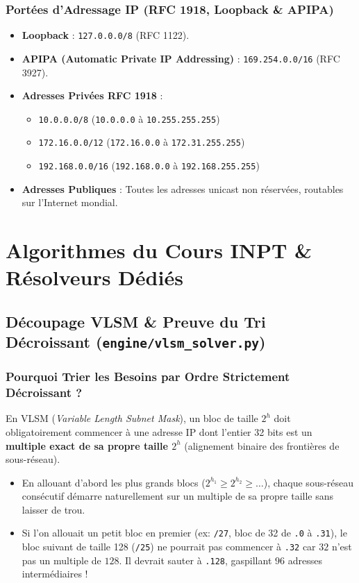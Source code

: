 \documentclass[11pt,a4paper]{report}
\begin{document}
\section{Port\'ees d'Adressage IP (RFC 1918, Loopback \& APIPA)}
\begin{itemize}
    \item \textbf{Loopback} : \texttt{127.0.0.0/8} (RFC 1122).
    \item \textbf{APIPA (Automatic Private IP Addressing)} : \texttt{169.254.0.0/16} (RFC 3927).
    \item \textbf{Adresses Priv\'ees RFC 1918} :
    \begin{itemize}
        \item \texttt{10.0.0.0/8} (\texttt{10.0.0.0} \`a \texttt{10.255.255.255})
        \item \texttt{172.16.0.0/12} (\texttt{172.16.0.0} \`a \texttt{172.31.255.255})
        \item \texttt{192.168.0.0/16} (\texttt{192.168.0.0} \`a \texttt{192.168.255.255})
    \end{itemize}
    \item \textbf{Adresses Publiques} : Toutes les adresses unicast non r\'eserv\'ees, routables sur l'Internet mondial.
\end{itemize}

\part{Algorithmes du Cours INPT \& R\'esolveurs D\'edi\'es}

\chapter{D\'ecoupage VLSM \& Preuve du Tri D\'ecroissant (\texttt{engine/vlsm\_solver.py})}

\section{Pourquoi Trier les Besoins par Ordre Strictement D\'ecroissant ?}
En VLSM (\textit{Variable Length Subnet Mask}), un bloc de taille $2^h$ doit obligatoirement commencer \`a une adresse IP dont l'entier 32 bits est un \textbf{multiple exact de sa propre taille $2^h$} (alignement binaire des fronti\`eres de sous-r\'eseau).
\begin{itemize}
    \item En allouant d'abord les plus grands blocs ($2^{h_1} \ge 2^{h_2} \ge \dots$), chaque sous-r\'eseau cons\'ecutif d\'emarre naturellement sur un multiple de sa propre taille sans laisser de trou.
    \item Si l'on allouait un petit bloc en premier (ex: \texttt{/27}, bloc de 32 de \texttt{.0} \`a \texttt{.31}), le bloc suivant de taille 128 (\texttt{/25}) ne pourrait pas commencer \`a \texttt{.32} car $32$ n'est pas un multiple de $128$. Il devrait sauter \`a \texttt{.128}, gaspillant $96$ adresses interm\'ediaires !
\end{itemize}
\end{document}
